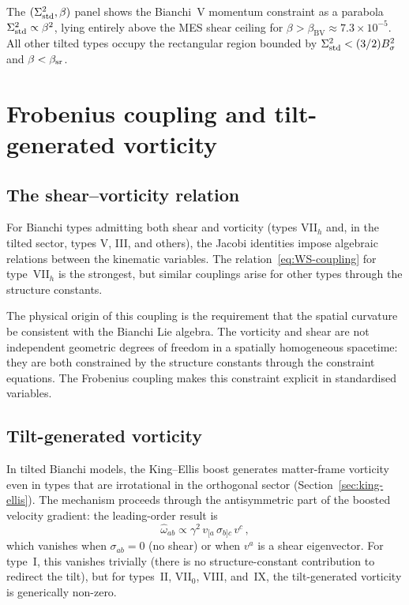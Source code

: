 The $(\Sigma^2_{\mathrm{std}}, \beta)$ panel shows the Bianchi~V momentum
constraint as a parabola $\Sigma^2_{\mathrm{std}} \propto \beta^2$, lying
entirely above the MES shear ceiling for $\beta > \beta_{\mathrm{BV}}
\approx 7.3 \times 10^{-5}$.  All other tilted types occupy the
rectangular region bounded by $\Sigma^2_{\mathrm{std}} < (3/2)B_\sigma^2$ and
$\beta < \beta_{\mathrm{sr}}$.


\section{Frobenius coupling and tilt-generated vorticity}
\label{sec:frobenius-coupling}

\subsection{The shear--vorticity relation}
\label{sec:shear-vort-relation}

For Bianchi types admitting both shear and vorticity (types
VII$_h$ and, in the tilted sector, types V, III, and others),
the Jacobi identities impose algebraic relations between the
kinematic variables.  The relation~\eqref{eq:WS-coupling} for
type~VII$_h$ is the strongest, but similar couplings arise for
other types through the structure constants.

The physical origin of this coupling is the requirement that
the spatial curvature be consistent with the Bianchi Lie algebra.
The vorticity and shear are not independent geometric degrees of
freedom in a spatially homogeneous spacetime: they are both
constrained by the structure constants through the constraint
equations.  The Frobenius coupling makes this constraint explicit
in standardised variables.


\subsection{Tilt-generated vorticity}\label{sec:tilt-vort}

In tilted Bianchi models, the King--Ellis boost generates
matter-frame vorticity even in types that are irrotational in
the orthogonal sector (Section~\ref{sec:king-ellis}).  The
mechanism proceeds through the antisymmetric part of the
boosted velocity gradient: the leading-order result is
\begin{equation}\label{eq:tilt-vort}
\hat{\omega}_{ab} \propto \gamma^2\,
  v_{[a}\,\sigma_{b]c}\,v^c\,,
\end{equation}
which vanishes when $\sigma_{ab} = 0$ (no shear) or when $v^a$
is a shear eigenvector.  For type~I, this vanishes trivially
(there is no structure-constant contribution to redirect the
tilt), but for types~II, VII$_0$, VIII, and~IX, the
tilt-generated vorticity is generically non-zero.

